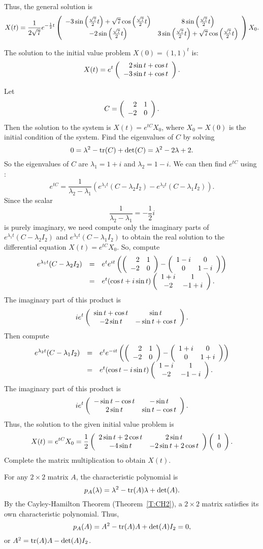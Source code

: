 Thus, the general solution is
\[
X(t) = \frac{1}{2\sqrt{7}}
e^{-\frac{1}{2}t}\left(\begin{array}{cc} -3\sin\left(\frac{\sqrt{7}}{2}t\right) +
\sqrt{7}\cos\left(\frac{\sqrt{7}}{2}t\right) & 8\sin\left(\frac{\sqrt{7}}{2}t\right)\\ -2\sin\left(\frac{\sqrt{7}}{2}t\right) &3\sin\left(\frac{\sqrt{7}}{2}t\right) +
\sqrt{7}\cos\left(\frac{\sqrt{7}}{2}t\right)\end{array}\right)X_0.
\]


\ans The solution to the initial value problem $X(0) = (1,1)^t$ is:
\[
X(t) = e^t\left(\begin{array}{r} 2\sin{t} + \cos{t} \\ -3\sin{t} + \cos{t}\end{array}\right).
\]

\soln Let
\[
C = \left(\begin{array}{rr} 2 & 1\\ -2 &0\end{array}\right).
\]
Then the solution to the system is $X(t) = e^{tC}X_0$, where
$X_0 = X(0)$ is the initial condition of the system.
Find the eigenvalues of $C$ by solving
\[
0 = \lambda^2 - {\rm tr}(C) + \det(C) = \lambda^2 - 2\lambda + 2.
\]
So the eigenvalues of $C$ are $\lambda_1 = 1 + i$ and $\lambda_2 = 1 - i$.
We can then find $e^{tC}$ using 
:
\[
e^{tC} = \frac{1}{\lambda_2 - \lambda_1}(e^{\lambda_1 t}(C -
\lambda_2 I_2) - e^{\lambda_2 t}(C - \lambda_1 I_2)).
\]
Since the scalar
\[
\frac{1}{\lambda_2 - \lambda_1} = -\frac{1}{2}i
\]
is purely imaginary, we need compute only the imaginary parts of
$e^{\lambda_1 t}(C - \lambda_2 I_2)$ and $e^{\lambda_2 t}(C - \lambda_1 I_2)$
to obtain the real solution to the differential equation $X(t) = e^{tC}X_0$.
So, compute
\[
\begin{array}{rcl}
e^{\lambda_1 t}(C - \lambda_2 I_2)
& = & e^{t}e^{it}\left(\left(\begin{array}{rr} 2 & 1\\ -2 &0\end{array}\right) - \left(\begin{array}{cc} 1 - i & 0\\ 0 &1 - i\end{array}\right)
\right) \\
& = & e^{t}(\cos t + i\sin t)\left(\begin{array}{cc} 1 + i & 1\\ -2 &-1 + i\end{array}\right).
\end{array}
\]
The imaginary part of this product is
\[
ie^t\left(\begin{array}{cc} \sin t + \cos t & \sin t\\ -2\sin t &-\sin t + \cos t\end{array}\right).
\]
Then compute
\[
\begin{array}{rcl}
e^{\lambda_2 t}(C - \lambda_1 I_2)
& = & e^{t}e^{-it}\left(\left(\begin{array}{rr} 2 & 1\\ -2 &0\end{array}\right) - \left(\begin{array}{cc} 1 + i & 0\\ 0 &1 + i\end{array}\right)
\right) \\
& = & e^{t}(\cos t - i\sin t)\left(\begin{array}{cc} 1 - i & 1\\ -2 &-1 - i\end{array}\right).
\end{array}
\]
The imaginary part of this product is
\[
ie^t\left(\begin{array}{cc} -\sin t - \cos t & -\sin t\\ 2\sin t &\sin t - \cos t\end{array}\right).
\]
Thus, the solution to the given initial value problem is
\[
X(t) = e^{tC}X_0 =
\frac{1}{2}\left(\begin{array}{cc} 2\sin t + 2\cos t & 2\sin t\\ -4\sin t &-2\sin t + 2\cos t\end{array}\right)
\left(\begin{array}{r} 1 \\ 0\end{array}\right).
\]
Complete the matrix multiplication to obtain $X(t)$.


 For any $2 \times 2$ matrix $A$, the characteristic
polynomial is
\[
p_A(\lambda) = \lambda^2 - {\rm tr}(A)\lambda + \det(A).
\]
By the Cayley-Hamilton Theorem (Theorem~\ref{T:CH2}), a $2 \times 2$
matrix satisfies its own characteristic polynomial.  Thus,
\[
p_A(A) = A^2 - {\rm tr}(A)A + \det(A)I_2 = 0,
\]
or $A^2 = {\rm tr}(A)A - \det(A)I_2$.


